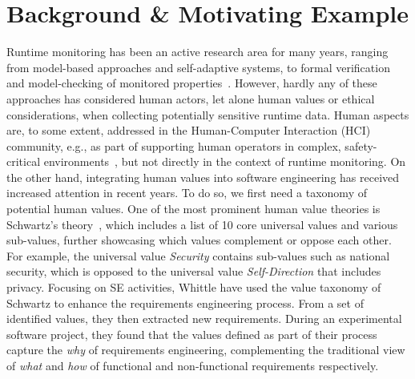 \section{Background \& Motivating Example}
\label{sec:background}
Runtime monitoring has been an active research area for many years, ranging from model-based approaches and self-adaptive systems, to formal verification and  model-checking of monitored properties~\cite{vierhauser2016requirements}. 
However, hardly any of these approaches has considered human actors, let alone human values or ethical considerations, when collecting potentially sensitive runtime data.
Human aspects are, to some extent, addressed in the Human-Computer Interaction (HCI) community, e.g., as part of supporting human operators in complex, safety-critical environments~\cite{schmid20}, but not directly in the context of runtime monitoring.
On the other hand, integrating human values into software engineering has received increased attention in recent years. To do so, we first need a taxonomy of potential human values.
One of the most prominent human value theories is Schwartz's theory~\cite{schwartz1992Universals}, which includes a list of 10 core universal values and various sub-values, further showcasing which values complement or oppose each other.
For example, the universal value \textit{Security} contains sub-values such as national security, which is opposed to the universal value \textit{Self-Direction} that includes privacy.
Focusing on SE activities, Whittle  have used the value taxonomy of Schwartz to enhance the requirements engineering process. 
From a set of identified values, they then extracted new requirements.
During an experimental software project, they found that the values defined as part of their process capture the \textit{why} of requirements engineering, complementing the traditional view of \textit{what} and \textit{how} of functional and non-functional requirements respectively.

